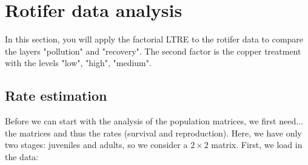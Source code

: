 \documentclass{article}\usepackage[]{graphicx}\usepackage[]{color}
\begin{document}
\section{Rotifer data analysis}
In this section, you will apply the factorial LTRE to the rotifer data to compare the layers "pollution" and "recovery". The second factor is the copper treatment with the levels "low", "high", "medium".

\subsection{Rate estimation}
Before we can start with the analysis of the population matrices, we first need... the matrices and thus the rates (survival and reproduction). Here, we have only two stages: juveniles and adults, so we consider a $2\times 2$ matrix. First, we load in the data:
\end{document}
